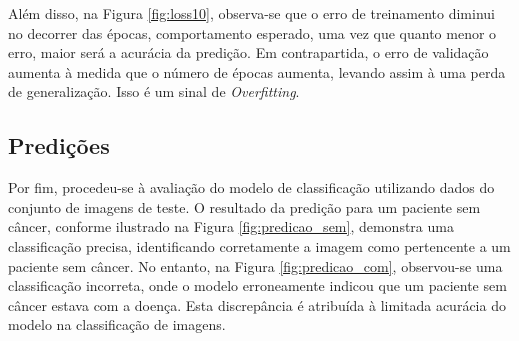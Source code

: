 Além disso, na Figura \ref{fig:loss10}, observa-se que o erro de treinamento diminui no decorrer das épocas, comportamento esperado, uma vez que quanto menor o erro, maior será a acurácia da predição. Em contrapartida, o erro de validação aumenta à medida que o número de épocas aumenta, levando assim à uma perda de generalização. Isso é um sinal de \textit{Overfitting}.



\subsection{\esp Predições} \label{pred}

Por fim, procedeu-se à avaliação do modelo de classificação utilizando dados do conjunto de imagens de teste. O resultado da predição para um paciente sem câncer, conforme ilustrado na Figura \ref{fig:predicao_sem}, demonstra uma classificação precisa, identificando corretamente a imagem como pertencente a um paciente sem câncer. No entanto, na Figura \ref{fig:predicao_com}, observou-se uma classificação incorreta, onde o modelo erroneamente indicou que um paciente sem câncer estava com a doença. Esta discrepância é atribuída à limitada acurácia do modelo na classificação de imagens.

